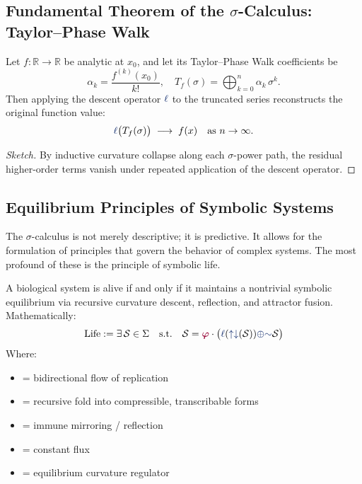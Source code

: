 \subsection{Fundamental Theorem of the $\sigma$-Calculus: Taylor--Phase Walk}
\label{thm:fundamental}

\begin{theorem}
Let $f\colon \mathbb{R}\to\mathbb{R}$ be analytic at $x_0$, and let
its Taylor--Phase Walk coefficients be
\[
  \alpha_k = \frac{f^{(k)}(x_0)}{k!},
  \quad T_f(\sigma) = \bigoplus_{k=0}^n \alpha_k\,\sigma^k.
\]
Then applying the descent operator $\lha$ to the truncated series
reconstructs the original function value:
\[
  \lha\bigl(T_f(\sigma)\bigr) \;\longrightarrow\; f(x)
  \quad\text{as }n\to\infty.
\]
\end{theorem}

\begin{proof}[Sketch]
By inductive curvature collapse along each $\sigma$-power path,
the residual higher-order terms vanish under repeated application of the descent operator.
\end{proof}

\subsection{Equilibrium Principles of Symbolic Systems}

The $\sigma$-calculus is not merely descriptive; it is predictive. It allows for the formulation of principles that govern the behavior of complex systems. The most profound of these is the principle of symbolic life.

\begin{principle}
A biological system is alive if and only if it maintains a nontrivial symbolic equilibrium via recursive curvature descent, reflection, and attractor fusion. Mathematically:
\[
\text{Life} := \exists \, \mathcal{S} \in \Sigma \quad \text{s.t.} \quad  
\mathcal{S} = \gold \cdot \big( \lha(\repflow(\mathcal{S})) \fuse \reflec \mathcal{S} \big)
\]
Where:
\begin{itemize}
    \item[\repflow] = bidirectional flow of replication
    \item[\lha] = recursive fold into compressible, transcribable forms
    \item[\reflec] = immune mirroring / reflection
    \item[\fuse] = constant flux
    \item[\gold] = equilibrium curvature regulator
\end{itemize}
\end{principle}

